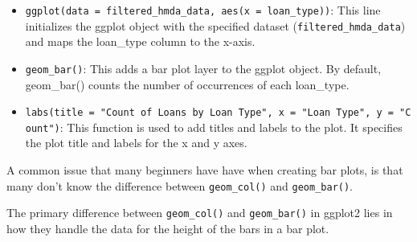 \documentclass[
]{book}
\providecommand{\tightlist}{%
  \setlength{\itemsep}{0pt}\setlength{\parskip}{0pt}}
\begin{document}
\begin{itemize}
\tightlist
\item
  \texttt{ggplot(data\ =\ filtered\_hmda\_data,\ aes(x\ =\ loan\_type))}: This line initializes the ggplot object with the specified dataset (\texttt{filtered\_hmda\_data}) and maps the loan\_type column to the x-axis.
\item
  \texttt{geom\_bar()}: This adds a bar plot layer to the ggplot object. By default, geom\_bar() counts the number of occurrences of each loan\_type.
\item
  \texttt{labs(title\ =\ "Count\ of\ Loans\ by\ Loan\ Type",\ x\ =\ "Loan\ Type",\ y\ =\ "Count")}: This function is used to add titles and labels to the plot. It specifies the plot title and labels for the x and y axes.
\end{itemize}

A common issue that many beginners have have when creating bar plots, is that many don't know the difference between \texttt{geom\_col()} and \texttt{geom\_bar()}.

The primary difference between \texttt{geom\_col()} and \texttt{geom\_bar()} in ggplot2 lies in how they handle the data for the height of the bars in a bar plot.
\end{document}
